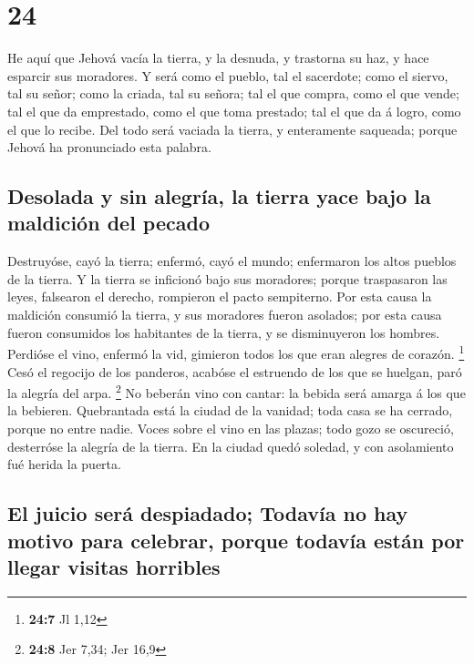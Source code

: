 \hypertarget{section-23}{%
\section{24}\label{section-23}}

 He aquí que Jehová vacía la tierra, y la desnuda, y
trastorna su haz, y hace esparcir sus moradores.  Y será
como el pueblo, tal el sacerdote; como el siervo, tal su señor; como la
criada, tal su señora; tal el que compra, como el que vende; tal el que
da emprestado, como el que toma prestado; tal el que da á logro, como el
que lo recibe.  Del todo será vaciada la tierra, y
enteramente saqueada; porque Jehová ha pronunciado esta palabra.

\hypertarget{desolada-y-sin-alegruxeda-la-tierra-yace-bajo-la-maldiciuxf3n-del-pecado}{%
\subsection{Desolada y sin alegría, la tierra yace bajo la maldición del
pecado}\label{desolada-y-sin-alegruxeda-la-tierra-yace-bajo-la-maldiciuxf3n-del-pecado}}

 Destruyóse, cayó la tierra; enfermó, cayó el mundo;
enfermaron los altos pueblos de la tierra.  Y la tierra se
inficionó bajo sus moradores; porque traspasaron las leyes, falsearon el
derecho, rompieron el pacto sempiterno.  Por esta causa la
maldición consumió la tierra, y sus moradores fueron asolados; por esta
causa fueron consumidos los habitantes de la tierra, y se disminuyeron
los hombres.  Perdióse el vino, enfermó la vid, gimieron
todos los que eran alegres de corazón. \footnote{\textbf{24:7} Jl 1,12}
 Cesó el regocijo de los panderos, acabóse el estruendo de
los que se huelgan, paró la alegría del arpa. \footnote{\textbf{24:8}
  Jer 7,34; Jer 16,9}  No beberán vino con cantar: la bebida
será amarga á los que la bebieren.  Quebrantada está la
ciudad de la vanidad; toda casa se ha cerrado, porque no entre nadie.
 Voces sobre el vino en las plazas; todo gozo se oscureció,
desterróse la alegría de la tierra.  En la ciudad quedó
soledad, y con asolamiento fué herida la puerta.

\hypertarget{el-juicio-seruxe1-despiadado-todavuxeda-no-hay-motivo-para-celebrar-porque-todavuxeda-estuxe1n-por-llegar-visitas-horribles}{%
\subsection{El juicio será despiadado; Todavía no hay motivo para
celebrar, porque todavía están por llegar visitas
horribles}\label{el-juicio-seruxe1-despiadado-todavuxeda-no-hay-motivo-para-celebrar-porque-todavuxeda-estuxe1n-por-llegar-visitas-horribles}}

